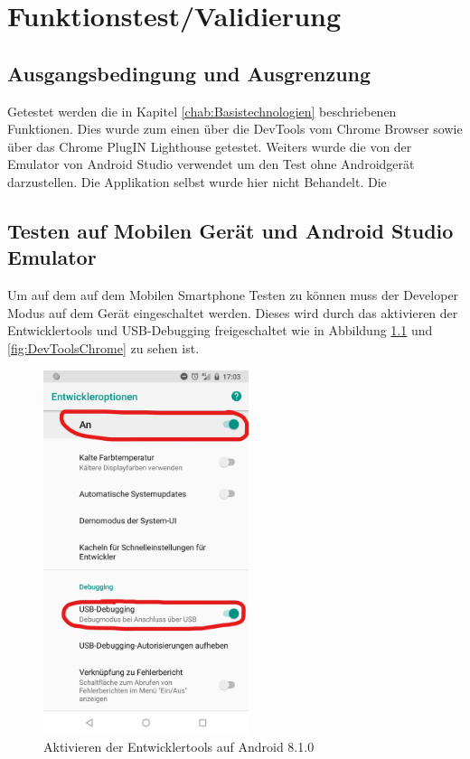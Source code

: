 \chapter{Funktionstest/Validierung}\label{chap:Funktionstest}
\thispagestyle{standard}
\pagestyle{standard}

\section{Ausgangsbedingung und Ausgrenzung}
Getestet werden die in Kapitel \ref{chab:Basistechnologien} beschriebenen Funktionen. Dies wurde zum einen über die DevTools vom Chrome Browser sowie über das Chrome PlugIN Lighthouse getestet. Weiters wurde die von der Emulator von Android Studio verwendet um den Test ohne Androidgerät darzustellen. Die Applikation selbst wurde hier nicht Behandelt.
Die 
 
\section{Testen auf Mobilen Gerät und Android Studio Emulator}
Um auf dem auf dem Mobilen Smartphone Testen zu können muss der Developer Modus auf dem Gerät eingeschaltet werden. Dieses wird durch das aktivieren der Entwicklertools und USB-Debugging freigeschaltet wie in Abbildung \ref{fig:DevToolsAndorid} und \ref{fig:DevToolsChrome} zu sehen ist. 

\begin{figure}[h]
	\centering
	\includegraphics[width=6cm]{BilderAllgemein/DevToolsAndroid}\medskip
	\caption{Aktivieren der Entwicklertools auf Android 8.1.0}
	\label{fig:DevToolsAndorid}
\end{figure}

